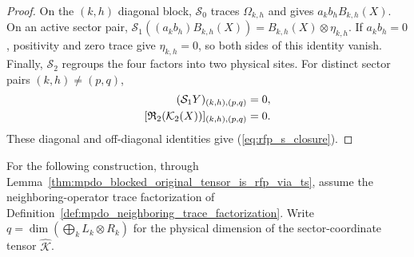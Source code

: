 \begin{proof}
    \leanok
    On the $(k,h)$ diagonal block, $\mathcal S_0$ traces
    $\Omega_{k,h}$ and gives $a_kb_hB_{k,h}(X)$. On an active sector pair,
    $\mathcal S_1((a_kb_h)B_{k,h}(X))
        =B_{k,h}(X)\otimes\eta_{k,h}$.
    If $a_kb_h=0$, positivity and zero trace give $\eta_{k,h}=0$, so both
    sides of this identity vanish. Finally, $\mathcal S_2$ regroups the four
    factors into two physical sites. For distinct sector pairs
    $(k,h)\ne(p,q)$,
    \begin{align}
        (\mathcal S_1Y)_{(k,h),(p,q)}                  & =0,
        \notag                                               \\
        [\mathfrak R_2(\mathcal K_2(X))]_{(k,h),(p,q)} & =0.
        \notag
    \end{align}
    These diagonal and off-diagonal identities give
    (\ref{eq:rfp_s_closure}).
\end{proof}

For the following construction, through
Lemma~\ref{thm:mpdo_blocked_original_tensor_is_rfp_via_ts}, assume the
neighboring-operator trace factorization of
Definition~\ref{def:mpdo_neighboring_trace_factorization}. Write
$q=\dim\!\left(\bigoplus_k L_k\otimes R_k\right)$
for the physical dimension of the sector-coordinate tensor
$\widehat{\mathcal K}$.
